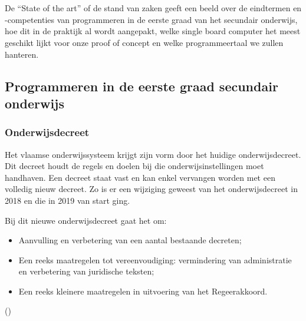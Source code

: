 
\chapter{}
\label{ch:stand-van-zaken}




De “State of the art” of de stand van zaken geeft een beeld over de eindtermen en -competenties van programmeren in de eerste graad van het secundair onderwijs, hoe dit in de praktijk al wordt aangepakt, welke single board computer het meest geschikt lijkt voor onze proof of concept en welke programmeertaal we zullen hanteren.

\section{Programmeren in de eerste graad secundair onderwijs}	

\subsection{Onderwijsdecreet}



Het vlaamse onderwijssysteem krijgt zijn vorm door het huidige onderwijsdecreet. Dit decreet houdt de regels en doelen bij die onderwijsinstellingen moet handhaven. Een decreet staat vast en kan enkel vervangen worden met een volledig nieuw decreet. 
Zo is er een wijziging geweest van het onderwijsdecreet in 2018 en die in 2019 van start ging.  


Bij dit nieuwe onderwijsdecreet gaat het om:

\begin{itemize}
    \item Aanvulling en verbetering van een aantal bestaande decreten;
    \item Een reeks maatregelen tot vereenvoudiging: vermindering van administratie en verbetering van juridische teksten;
    \item Een reeks kleinere maatregelen in uitvoering van het Regeerakkoord.
\end{itemize} (\cite{VLOR2020})

